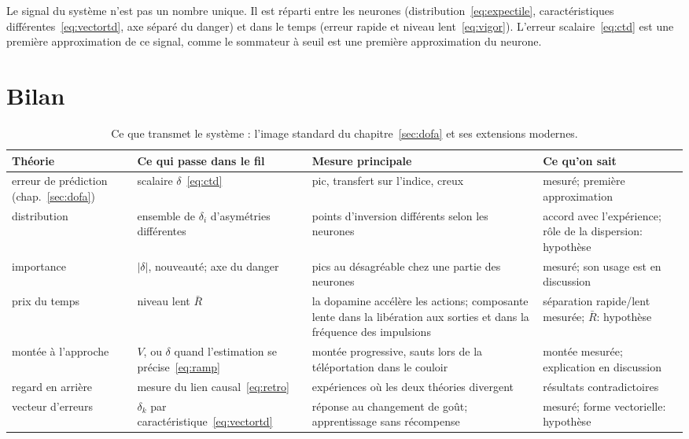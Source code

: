 \begin{keyblock}
\begin{proposition}
\label{prop:bundle}
Le signal du système  n'est pas un nombre unique. Il est réparti entre les neurones (distribution~\eqref{eq:expectile}, caractéristiques différentes~\eqref{eq:vectortd}, axe séparé du danger) et dans le temps (erreur rapide et niveau lent~\eqref{eq:vigor}). L'erreur scalaire~\eqref{eq:ctd} est une première approximation de ce signal, comme le sommateur à seuil est une première approximation du neurone.
\end{proposition}
\end{keyblock}

\section{Bilan}

\begin{table}[t]
\centering
\footnotesize
\setlength{\tabcolsep}{4pt}
\renewcommand{\arraystretch}{1.15}
\begin{tabular}{>{\raggedright}p{2.5cm}>{\raggedright}p{3.2cm}>{\raggedright}p{3.6cm}>{\raggedright\arraybackslash}p{4.2cm}}
\toprule
Théorie & Ce qui passe dans le fil & Mesure principale & Ce qu'on sait \\
\midrule
erreur de prédiction (chap.~\ref{sec:dofa}) & scalaire $\delta$~\eqref{eq:ctd} & pic, transfert sur l'indice, creux & mesuré; première approximation \\
distribution & ensemble de $\delta_i$ d'asymétries différentes & points d'inversion différents selon les neurones & accord avec l'expérience; rôle de la dispersion: hypothèse \\
importance & $|\delta|$, nouveauté; axe du danger & pics au désagréable chez une partie des neurones & mesuré; son usage est en discussion \\
prix du temps & niveau lent $\bar R$ & la dopamine accélère les actions; composante lente dans la libération aux sorties et dans la fréquence des impulsions & séparation rapide/lent mesurée; $\bar R$: hypothèse \\
montée à l'approche & $V$, ou $\delta$ quand l'estimation se précise~\eqref{eq:ramp} & montée progressive, sauts lors de la téléportation dans le couloir & montée mesurée; explication en discussion \\
regard en arrière & mesure du lien causal~\eqref{eq:retro} & expériences où les deux théories divergent & résultats contradictoires \\
vecteur d'erreurs & $\delta_k$ par caractéristique~\eqref{eq:vectortd} & réponse au changement de goût; apprentissage sans récompense & mesuré; forme vectorielle: hypothèse \\
\bottomrule
\end{tabular}
\caption{Ce que transmet le système : l'image standard du chapitre~\ref{sec:dofa} et ses extensions modernes.}
\label{tab:dofaalt}
\end{table}


